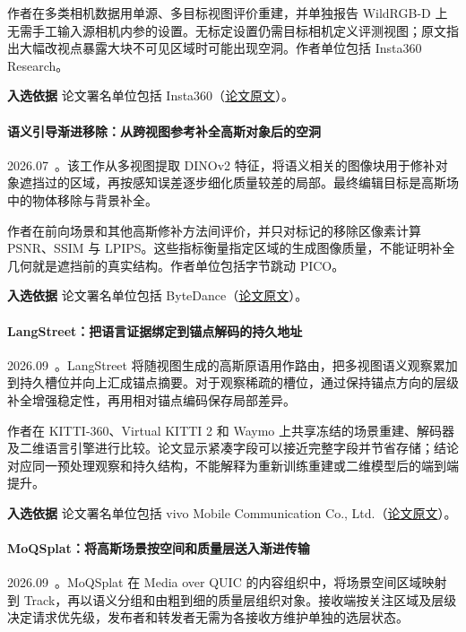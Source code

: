作者在多类相机数据用单源、多目标视图评价重建，并单独报告 WildRGB-D 上无需手工输入源相机内参的设置。无标定设置仍需目标相机定义评测视图；原文指出大幅改视点暴露大块不可见区域时可能出现空洞。作者单位包括 Insta360 Research。

\textbf{入选依据} 论文署名单位包括 Insta360（\href{https://arxiv.org/html/2606.07514v1}{论文原文}）。

\paragraph{语义引导渐进移除：从跨视图参考补全高斯对象后的空洞}
2026.07~\cite{2607_04144}。该工作从多视图提取 DINOv2 特征，将语义相关的图像块用于修补对象遮挡过的区域，再按感知误差逐步细化质量较差的局部。最终编辑目标是高斯场中的物体移除与背景补全。

作者在前向场景和其他高斯修补方法间评价，并只对标记的移除区像素计算 PSNR、SSIM 与 LPIPS。这些指标衡量指定区域的生成图像质量，不能证明补全几何就是遮挡前的真实结构。作者单位包括字节跳动 PICO。

\textbf{入选依据} 论文署名单位包括 ByteDance（\href{https://arxiv.org/html/2607.04144v1}{论文原文}）。

\paragraph{LangStreet：把语言证据绑定到锚点解码的持久地址}
2026.09~\cite{2609_11616}。LangStreet 将随视图生成的高斯原语用作路由，把多视图语义观察累加到持久槽位并向上汇成锚点摘要。对于观察稀疏的槽位，通过保持锚点方向的层级补全增强稳定性，再用相对锚点编码保存局部差异。

作者在 KITTI-360、Virtual KITTI 2 和 Waymo 上共享冻结的场景重建、解码器及二维语言引擎进行比较。论文显示紧凑字段可以接近完整字段并节省存储；结论对应同一预处理观察和持久结构，不能解释为重新训练重建或二维模型后的端到端提升。

\textbf{入选依据} 论文署名单位包括 vivo Mobile Communication Co., Ltd.（\href{https://arxiv.org/html/2609.11616v1}{论文原文}）。

\paragraph{MoQSplat：将高斯场景按空间和质量层送入渐进传输}
2026.09~\cite{2609_18624}。MoQSplat 在 Media over QUIC 的内容组织中，将场景空间区域映射到 Track，再以语义分组和由粗到细的质量层组织对象。接收端按关注区域及层级决定请求优先级，发布者和转发者无需为各接收方维护单独的选层状态。

